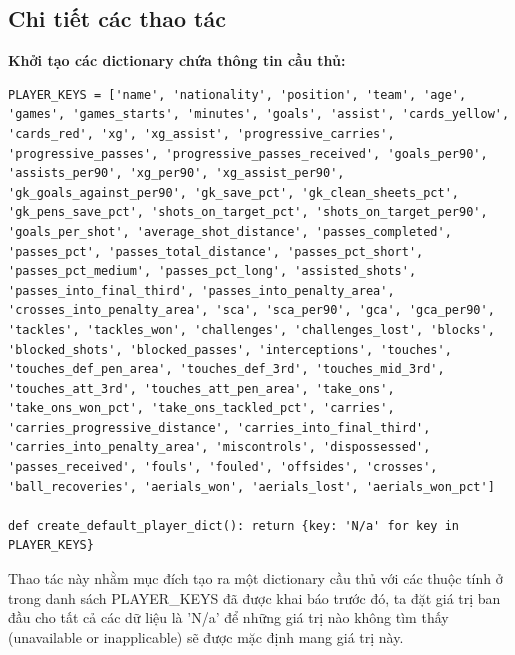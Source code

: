 \documentclass[12pt]{report}
\begin{document}
{\subsection{Chi tiết các thao tác}
\textbf*{Khởi tạo các dictionary chứa thông tin cầu thủ:}
\begin{lstlisting}
PLAYER_KEYS = ['name', 'nationality', 'position', 'team', 'age', 'games', 'games_starts', 'minutes', 'goals', 'assist', 'cards_yellow', 'cards_red', 'xg', 'xg_assist', 'progressive_carries', 'progressive_passes', 'progressive_passes_received', 'goals_per90', 'assists_per90', 'xg_per90', 'xg_assist_per90', 'gk_goals_against_per90', 'gk_save_pct', 'gk_clean_sheets_pct', 'gk_pens_save_pct', 'shots_on_target_pct', 'shots_on_target_per90', 'goals_per_shot', 'average_shot_distance', 'passes_completed', 'passes_pct', 'passes_total_distance', 'passes_pct_short', 'passes_pct_medium', 'passes_pct_long', 'assisted_shots', 'passes_into_final_third', 'passes_into_penalty_area', 'crosses_into_penalty_area', 'sca', 'sca_per90', 'gca', 'gca_per90', 'tackles', 'tackles_won', 'challenges', 'challenges_lost', 'blocks', 'blocked_shots', 'blocked_passes', 'interceptions', 'touches', 'touches_def_pen_area', 'touches_def_3rd', 'touches_mid_3rd', 'touches_att_3rd', 'touches_att_pen_area', 'take_ons', 'take_ons_won_pct', 'take_ons_tackled_pct', 'carries', 'carries_progressive_distance', 'carries_into_final_third', 'carries_into_penalty_area', 'miscontrols', 'dispossessed', 'passes_received', 'fouls', 'fouled', 'offsides', 'crosses', 'ball_recoveries', 'aerials_won', 'aerials_lost', 'aerials_won_pct']

def create_default_player_dict(): return {key: 'N/a' for key in PLAYER_KEYS}

\end{lstlisting}
Thao tác này nhằm mục đích tạo ra một dictionary cầu thủ với các thuộc tính ở trong danh sách PLAYER\_KEYS đã được khai báo trước đó, ta đặt giá trị ban đầu cho tất cả các dữ liệu là 'N/a' để những giá trị nào không tìm thấy (unavailable or inapplicable) sẽ được mặc định mang giá trị này.\\

}
\end{document}
